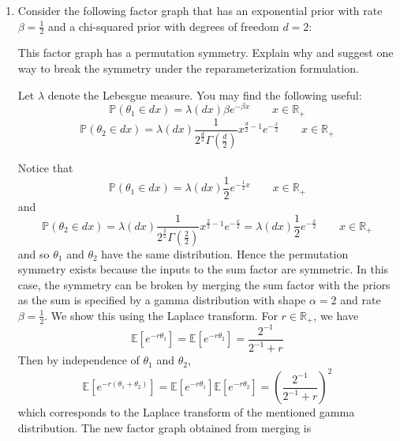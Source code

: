 \begin{enumerate}
\newpage

\item
Consider the following factor graph that has an exponential prior with rate $\beta = \frac{1}{2}$ and a chi-squared prior with degrees of freedom $d=2$:

\begin{figure}[h]
\begin{center}
\end{center}
\end{figure}

This factor graph has a permutation symmetry. Explain why and suggest one way to break the symmetry under the reparameterization formulation.

Let $\lambda$ denote the Lebesgue measure. You may find the following useful:
\[
\mathbb{P}(\theta_1\in dx) = \lambda(dx)\beta e^{-\beta x} \qquad x\in\mathbb{R}_+
\]
\[
\mathbb{P}(\theta_2\in dx) = \lambda(dx)\frac{1}{2^{\frac{d}{2}}\Gamma\left(\frac{d}{2}\right)}x^{\frac{d}{2}-1}e^{-\frac{x}{2}} \qquad x\in\mathbb{R}_+
\]

\begin{solution}
Notice that
\[
\mathbb{P}(\theta_1\in dx) = \lambda(dx)\frac{1}{2}e^{-\frac{1}{2}x} \qquad x\in\mathbb{R}_+
\]
and
\[
\mathbb{P}(\theta_2\in dx) = \lambda(dx)\frac{1}{2^{\frac{2}{2}}\Gamma\left(\frac{2}{2}\right)}x^{\frac{2}{2}-1}e^{-\frac{x}{2}} = \lambda(dx)\frac{1}{2}e^{-\frac{x}{2}} \qquad x\in\mathbb{R}_+
\]
and so $\theta_1$ and $\theta_2$ have the same distribution. Hence the permutation symmetry exists because the inputs to the sum factor are symmetric. In this case, the symmetry can be broken by merging the sum factor with the priors as the sum is specified by a gamma distribution with shape $\alpha=2$ and rate $\beta=\frac{1}{2}$. We show this using the Laplace transform. For $r\in\mathbb{R}_+$, we have
\[
\mathbb{E}[e^{-r\theta_1}] = \mathbb{E}[e^{-r\theta_2}] = \frac{2^{-1}}{2^{-1}+r}
\]
Then by independence of $\theta_1$ and $\theta_2$,
\[
\mathbb{E}[e^{-r(\theta_1+\theta_2)}] = \mathbb{E}[e^{-r\theta_1}]\mathbb{E}[e^{-r\theta_2}] = \left(\frac{2^{-1}}{2^{-1}+r}\right)^2
\]
which corresponds to the Laplace transform of the mentioned gamma distribution. The new factor graph obtained from merging is

\begin{figure}[h]
\begin{center}
\end{center}
\end{figure}
\end{solution}

\end{enumerate}